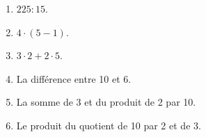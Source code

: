 %
%
    \begin{enumerate}
        \item $225 : 15$.
        \item $4 \cdot (5 - 1)$.
        \item $3 \cdot 2 + 2 \cdot 5$.
        \item La différence entre 10 et 6.
        \item La somme de 3 et du produit de 2 par 10.
        \item Le produit du quotient de 10 par 2 et de 3.
    \end{enumerate}
